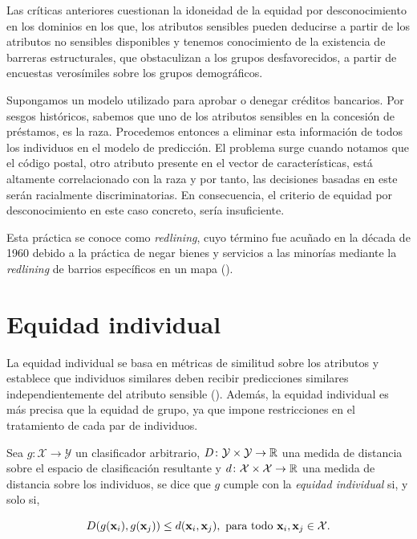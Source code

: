 \documentclass[oneside,openright,titlepage,numbers=noenddot,openany,headinclude,footinclude=true,
cleardoublepage=empty,abstractoff,BCOR=5mm,paper=a4,fontsize=12pt,main=spanish]{scrreprt}
\begin{document}
Las críticas anteriores cuestionan la idoneidad de la
equidad por desconocimiento en los dominios en
los que, los atributos sensibles pueden deducirse a partir de los atributos no sensibles disponibles y tenemos conocimiento de la existencia de barreras estructurales, que obstaculizan a los grupos desfavorecidos, a partir de encuestas verosímiles sobre los grupos demográficos.

\begin{example} \label{ex:redlining}
Supongamos un modelo utilizado para aprobar o denegar créditos bancarios. Por sesgos históricos, sabemos que uno de los atributos sensibles en la concesión de préstamos, es la raza. Procedemos entonces a eliminar esta información de todos los individuos en el modelo de predicción. El problema surge cuando notamos que el código postal, otro atributo presente en el vector de características, está altamente correlacionado con la raza y por tanto, las decisiones basadas en este serán racialmente discriminatorias. En consecuencia, el criterio de equidad por desconocimiento en este caso concreto, sería insuficiente. 

Esta práctica se conoce como \textit{redlining}, cuyo término fue acuñado en la década de 1960 debido a la práctica de negar bienes y servicios a las minorías mediante la \textit{redlining} de barrios específicos en un mapa (\cite{redlining2012}).
\end{example}


\section{Equidad individual}

La equidad individual se basa en métricas de similitud sobre los atributos y  establece que individuos similares deben recibir predicciones similares independientemente del atributo sensible (\cite{detect2012}). Además, la equidad individual es más precisa que la equidad de grupo, ya que impone restricciones en el tratamiento de cada par de individuos.\\ 

\begin{definition} \label{def:indvfair}
Sea $g\colon \mathcal{X} \to \mathcal{Y}$ un clasificador arbitrario, $D\colon \mathcal{Y} \times \mathcal{Y} \to \mathbb{R}$ una medida de distancia sobre el espacio de clasificación resultante y $d\colon \mathcal{X} \times \mathcal{X} \to \mathbb{R}$ una medida de distancia sobre los individuos, se dice que $g$ cumple con la \textit{equidad individual} si, y solo si,

\begin{equation*} 
D(g(\textbf{x}_i),g(\textbf{x}_j))\leq d(\textbf{x}_i,\textbf{x}_j), \ \text{para todo} \ \textbf{x}_i,\textbf{x}_j \in \mathcal{X}.
\end{equation*}
\end{definition}\
\end{document}
